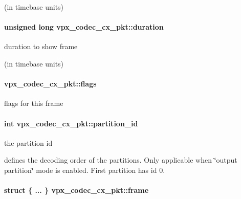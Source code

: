  (in timebase units) \hypertarget{structvpx__codec__cx__pkt_afb8d9069980e759d97d2eb9fae7e5e06}{
\paragraph[{duration}]{\setlength{\rightskip}{0pt plus 5cm}unsigned long vpx\-\_\-codec\-\_\-cx\-\_\-pkt\-::duration}}\label{structvpx__codec__cx__pkt_afb8d9069980e759d97d2eb9fae7e5e06}
\begin{DoxyVerb}duration to show frame
\end{DoxyVerb}
 (in timebase units) \hypertarget{structvpx__codec__cx__pkt_a3876fe0306342611465e9c15c6c4ae2f}{
\paragraph[{flags}]{ vpx\-\_\-codec\-\_\-cx\-\_\-pkt\-::flags}}\label{structvpx__codec__cx__pkt_a3876fe0306342611465e9c15c6c4ae2f}
flags for this frame \hypertarget{structvpx__codec__cx__pkt_aaffee6af93af238ca7a145fb56c6d6f7}{
\paragraph[{partition\-\_\-id}]{\setlength{\rightskip}{0pt plus 5cm}int vpx\-\_\-codec\-\_\-cx\-\_\-pkt\-::partition\-\_\-id}}\label{structvpx__codec__cx__pkt_aaffee6af93af238ca7a145fb56c6d6f7}
\begin{DoxyVerb}          the partition id
\end{DoxyVerb}
 defines the decoding order of the partitions. Only applicable when \char`\"{}output partition\char`\"{} mode is enabled. First partition has id 0. \hypertarget{structvpx__codec__cx__pkt_a81e33bf4408a3983abb16492fee359ff}{
\paragraph[{frame}]{\setlength{\rightskip}{0pt plus 5cm}struct \{ ... \}   vpx\-\_\-codec\-\_\-cx\-\_\-pkt\-::frame}}\label{structvpx__codec__cx__pkt_a81e33bf4408a3983abb16492fee359ff}
